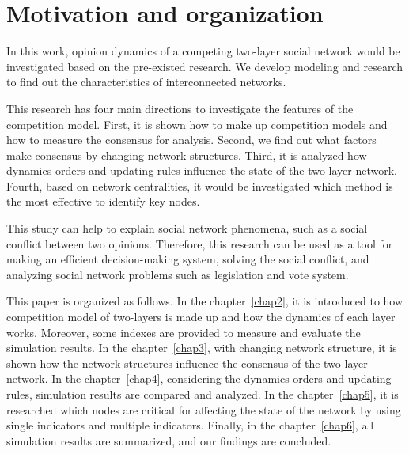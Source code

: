 \section{Motivation and organization}

In this work, opinion dynamics of a competing two-layer social network would be investigated based on the pre-existed research\parencite{alvarez2016, gomez2015, diep2017, rocca2014}. We develop modeling and research to find out the characteristics of interconnected networks. 

This research has four main directions to investigate the features of the competition model. First, it is shown how to make up competition models and how to measure the consensus for analysis. Second, we find out what factors make consensus by changing network structures. Third, it is analyzed how dynamics orders and updating rules influence the state of the two-layer network. Fourth, based on network centralities, it would be investigated which method is the most effective to identify key nodes.

This study can help to explain social network phenomena, such as a social conflict between two opinions. Therefore, this research can be used as a tool for making an efficient decision-making system, solving the social conflict, and analyzing social network problems such as legislation and vote system.

This paper is organized as follows. In the chapter~\ref{chap2}, it is introduced to how competition model of two-layers is made up and how the dynamics of each layer works. Moreover, some indexes are provided to measure and evaluate the simulation results. In the chapter~\ref{chap3}, with changing network structure, it is shown how the network structures influence the consensus of the two-layer network. In the chapter~\ref{chap4}, considering the dynamics orders and updating rules, simulation results are compared and analyzed. In the chapter~\ref{chap5}, it is researched which nodes are critical for affecting the state of the network by using single indicators and multiple indicators. Finally, in the chapter~\ref{chap6}, all simulation results are summarized, and our findings are concluded. \\


